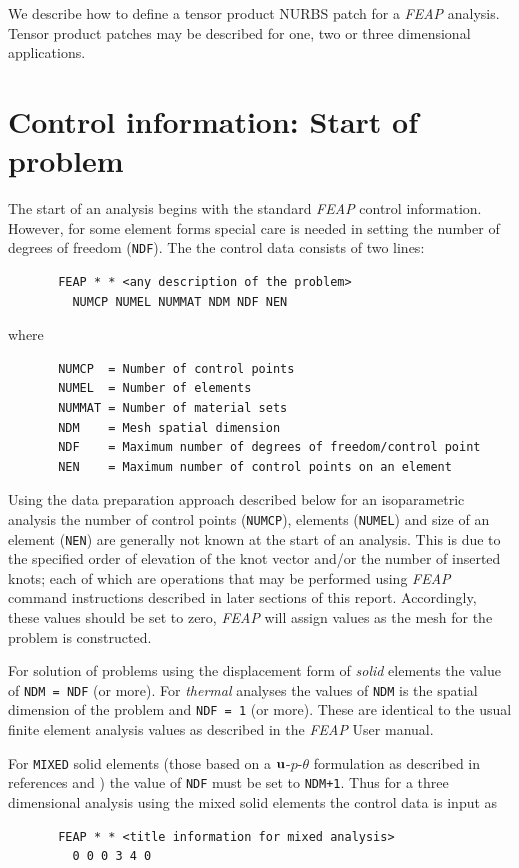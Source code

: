 We describe how to define a tensor product NURBS patch for a
\textsl{FEAP} analysis.  Tensor product patches may be described for
one, two or three dimensional applications.

\section{Control information: Start of problem}
\label{ncontrol}

The start of an analysis begins with the standard \textsl{FEAP} control
information. However, for some element forms special care is needed in
setting the number of degrees of freedom (\texttt{NDF}).  The
the control data consists of two lines:
\begin{verbatim}
       FEAP * * <any description of the problem>
         NUMCP NUMEL NUMMAT NDM NDF NEN
\end{verbatim}
where
\begin{verbatim}
       NUMCP  = Number of control points
       NUMEL  = Number of elements
       NUMMAT = Number of material sets
       NDM    = Mesh spatial dimension
       NDF    = Maximum number of degrees of freedom/control point
       NEN    = Maximum number of control points on an element
\end{verbatim}
Using the data preparation approach described below for
an isoparametric analysis the number of control points
(\texttt{NUMCP}), elements (\texttt{NUMEL}) and size of an element
(\texttt{NEN}) are generally not
known at the start of an analysis.  This is due to the specified order
of elevation of the knot vector and/or the number of inserted knots;
each of which are operations that may be performed using \textsl{FEAP} command
instructions described in later sections of this report.  Accordingly,
these values should be set to zero, \textsl{FEAP} will assign values
as the mesh for the problem is constructed.

For solution of problems using the displacement form of \textit{solid}
elements the value of \texttt{NDM = NDF} (or more).  For \textit{thermal}
analyses the values of \texttt{NDM} is the spatial dimension of the
problem  and \texttt{NDF = 1} (or more).  These are identical to the
usual finite element analysis values as
described in the \textsl{FEAP} User manual.

For \texttt{MIXED} solid elements (those based on a
$\mathbf{u}$-$p$-$\theta$ formulation as described in references
\cite{zt1n7} and \cite{taylor11a}) the value of \texttt{NDF} must be
set to \texttt{NDM+1}.  Thus for a three dimensional analysis using the
mixed solid elements the control data is input as
\begin{verbatim}
       FEAP * * <title information for mixed analysis>
         0 0 0 3 4 0
\end{verbatim}

